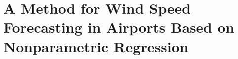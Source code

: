 
\chapter{A Method for Wind Speed Forecasting in Airports Based on Nonparametric Regression} 

\label{AppendixA} %
